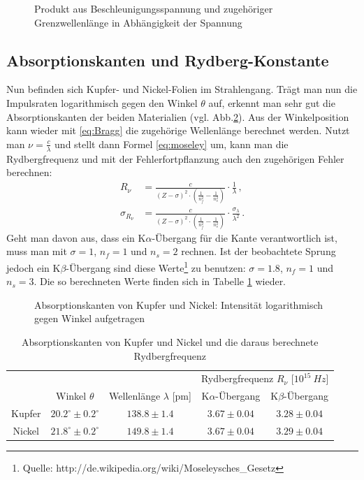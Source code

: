 \documentclass[12pt,a4paper,titlepage,headinclude,bibtotoc]{scrartcl}
\begin{document}
\begin{figure}[!htb]
	\centering
	
	\caption{Produkt aus Beschleunigungsspannung und zugehöriger Grenzwellenlänge in Abhängigkeit der Spannung}
	\label{fig:grenzLambda}
\end{figure}

\subsection{Absorptionskanten und Rydberg-Konstante}
Nun befinden sich Kupfer- und Nickel-Folien im Strahlengang.
Trägt man nun die Impulsraten logarithmisch gegen den Winkel $\theta$ auf, erkennt man sehr gut die Absorptionskanten der beiden Materialien (vgl. Abb.\ref{fig:messung4}).
Aus der Winkelposition kann wieder mit \eqref{eq:Bragg} die zugehörige Wellenlänge berechnet werden.
Nutzt man $\nu=\frac{c}{\lambda}$ und stellt dann Formel \eqref{eq:moseley} um, kann man die Rydbergfrequenz und mit der Fehlerfortpflanzung auch den zugehörigen Fehler berechnen:
\begin{align}
	R_\nu&=\frac{c}{(Z-\sigma)^2\cdot\left(\frac{1}{n_f^2}-\frac{1}{n_s^2}\right)}\cdot \frac{1}{\lambda}\,,\\
	\sigma_{R_\nu}&=\frac{c}{(Z-\sigma)^2\cdot\left(\frac{1}{n_f^2}-\frac{1}{n_s^2}\right)}\cdot \frac{\sigma_\lambda}{\lambda^2}\,.
\end{align}
Geht man davon aus, dass ein K$\alpha$-Übergang für die Kante verantwortlich ist, muss man mit $\sigma=1$, $n_f=1$ und $n_s=2$ rechnen.
Ist der beobachtete Sprung jedoch ein K$\beta$-Übergang sind diese Werte\footnote{Quelle: http://de.wikipedia.org/wiki/Moseleysches_Gesetz} zu benutzen: $\sigma=1.8$, $n_f=1$ und $n_s=3$.
Die so berechneten Werte finden sich in Tabelle \ref{tab:Rydberg} wieder.
\begin{figure}[!htb]
	\centering
	
	\caption{Absorptionskanten von Kupfer und Nickel: Intensität logarithmisch gegen Winkel aufgetragen}
	\label{fig:messung4}
\end{figure}

\begin{table}[!htb]
	\centering
	\begin{tabular}{|c|c|c|c|c|}
		\hline
		& & & \multicolumn{2}{c|}{Rydbergfrequenz $R_\nu$ [$10^{15}~\si{Hz}$]} \\		
		& Winkel $\theta$ & Wellenlänge $\lambda$ [pm] & K$\alpha$-Übergang & K$\beta$-Übergang\\
		\hline
		Kupfer & $20.2^\circ \pm 0.2^\circ$ & $138.8 \pm 1.4$ & $3.67 \pm 0.04$ & $3.28 \pm 0.04$\\
		Nickel & $21.8^\circ \pm 0.2^\circ$ & $149.8 \pm 1.4$ & $3.67 \pm 0.04$ & $3.29 \pm 0.04$ \\
		\hline
	\end{tabular}
	\caption{Absorptionskanten von Kupfer und Nickel und die daraus berechnete Rydbergfrequenz}
	\label{tab:Rydberg}
\end{table}
\end{document}

